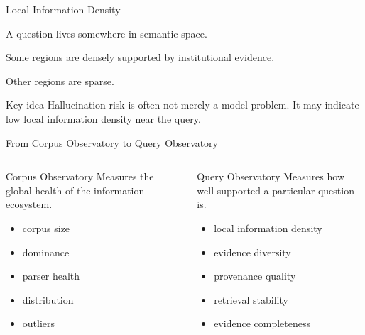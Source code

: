\documentclass[aspectratio=169]{beamer}
\begin{document}
\begin{frame}{Local Information Density}

\Large

A question lives somewhere in semantic space.

\vspace{0.5cm}

Some regions are densely supported by institutional evidence.

\vspace{0.3cm}

Other regions are sparse.

\vspace{0.7cm}

\begin{block}{Key idea}
Hallucination risk is often not merely a model problem. It may indicate low local information density near the query.
\end{block}

\end{frame}

\begin{frame}{From Corpus Observatory to Query Observatory}

\begin{columns}[T]


\begin{block}{Corpus Observatory}
Measures the global health of the information ecosystem.

\begin{itemize}
\item corpus size
\item dominance
\item parser health
\item distribution
\item outliers
\end{itemize}
\end{block}


\begin{block}{Query Observatory}
Measures how well-supported a particular question is.

\begin{itemize}
\item local information density
\item evidence diversity
\item provenance quality
\item retrieval stability
\item evidence completeness
\end{itemize}
\end{block}

\end{columns}

\end{frame}
\end{document}
